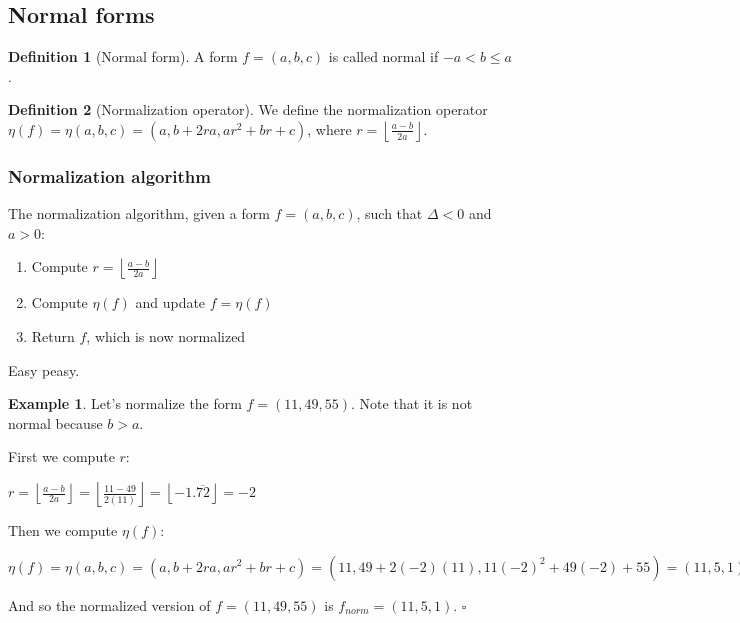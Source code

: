 \documentclass{article}
\theoremstyle{definition}
\newtheorem{definition}{Definition}[section]
\theoremstyle{theorem}
\theoremstyle{example}
\newtheorem{example}{Example}[section]
\theoremstyle{corollary}
\begin{document}
\bigskip

\subsection{Normal forms}

\bigskip

\theoremstyle{definition}
\begin{definition}[Normal form]
A form \(f = (a, b, c)\) is called normal if \(-a < b \le a\).
\end{definition}

\bigskip

\theoremstyle{definition}
\begin{definition}[Normalization operator]
We define the normalization operator \(\eta (f) = \eta (a, b, c) = (a, b + 2ra, ar^{2} + br + c)\), where \(r = \left\lfloor \frac{a-b}{2a} \right\rfloor\).
\end{definition}

\bigskip

\subsubsection{Normalization algorithm}

\bigskip

The normalization algorithm, given a form \(f = (a, b, c)\), such that \(\Delta < 0\) and \(a > 0\):
\begin{enumerate}
\item Compute \(r = \left\lfloor \frac{a-b}{2a} \right\rfloor\)
\item Compute \(\eta( f)\) and update \(f = \eta(f)\)
\item Return \(f\), which is now normalized
\end{enumerate}

\bigskip

Easy peasy.

\bigskip

\theoremstyle{example}
\begin{example}
Let's normalize the form \(f = (11, 49, 55)\). Note that it is not normal because \(b > a\).

\bigskip

First we compute \(r\):
\begin{center}
\(r = \left\lfloor \frac{a-b}{2a} \right\rfloor = \left\lfloor \frac{11 - 49}{2(11)} \right\rfloor = \left\lfloor -1.\overline{72} \right\rfloor = -2\)
\end{center}

Then we compute \(\eta (f) \):
\begin{center}
\(\eta (f) = \eta (a, b, c) = (a, b + 2ra, ar^{2} + br + c) = (11, 49 + 2(-2)(11), 11(-2)^{2} + 49(-2) + 55) = (11, 5, 1)\)
\end{center}

And so the normalized version of \(f = (11, 49, 55) \) is \(f_{norm} = (11, 5, 1)\). \(\square\)
\end{example}
\end{document}
